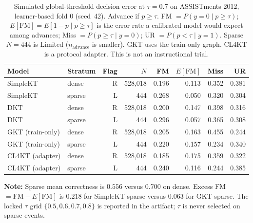 \begin{table}[htbp]
\caption{Simulated global-threshold decision error at $\tau=0.7$ on ASSISTments 2012, learner-based fold 0 (seed~42). Advance if $p\ge\tau$. FM $=P(y=0\mid p\ge\tau)$; $E[\mathrm{FM}]=E[1-p\mid p\ge\tau]$ is the error rate a calibrated model would expect among advances; Miss $=P(p\ge\tau\mid y=0)$; UR $=P(p<\tau\mid y=1)$. Sparse $N=444$ is Limited ($n_{\mathrm{advance}}$ is smaller). GKT uses the train-only graph. CL4KT is a protocol adapter. This is not an instructional trial.}
\label{tab:c_tau07}
\centering
\footnotesize
\setlength{\tabcolsep}{4pt}
\begin{tabular}{llrrrrrr}
\toprule
Model & Stratum & Flag & $N$ & FM & $E[\mathrm{FM}]$ & Miss & UR \\
\midrule
SimpleKT & dense & R & 528{,}018 & 0.196 & 0.113 & 0.352 & 0.381 \\
SimpleKT & sparse & L & 444 & 0.268 & 0.050 & 0.320 & 0.304 \\
\midrule
DKT & dense & R & 528{,}018 & 0.200 & 0.147 & 0.398 & 0.316 \\
DKT & sparse & L & 444 & 0.296 & 0.057 & 0.365 & 0.308 \\
\midrule
GKT (train-only) & dense & R & 528{,}018 & 0.205 & 0.163 & 0.455 & 0.244 \\
GKT (train-only) & sparse & L & 444 & 0.220 & 0.157 & 0.234 & 0.340 \\
\midrule
CL4KT (adapter) & dense & R & 528{,}018 & 0.185 & 0.175 & 0.359 & 0.322 \\
CL4KT (adapter) & sparse & L & 444 & 0.240 & 0.116 & 0.244 & 0.385 \\
\bottomrule
\end{tabular}

\vspace{1ex}
{\scriptsize \textbf{Note:} Sparse mean correctness is $0.556$ versus $0.700$ on dense. Excess FM $=\mathrm{FM}-E[\mathrm{FM}]$ is $0.218$ for SimpleKT sparse versus $0.063$ for GKT sparse. The locked $\tau$ grid $\{0.5,0.6,0.7,0.8\}$ is reported in the artifact; $\tau$ is never selected on sparse events.\par}
\end{table}
